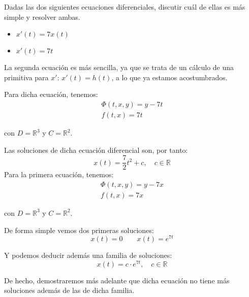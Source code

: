 \begin{ejemplo}
    Dadas las dos siguientes ecuaciones diferenciales, discutir cuál de ellas es más simple y resolver ambas.
    \begin{itemize}
        \item $x'(t) = 7x(t)$
        \item $x'(t) = 7t$
    \end{itemize}
    La segunda ecuación es más sencilla, ya que se trata de un cálculo de una primitiva para $x'$: $x'(t) = h(t)$, a lo que ya estamos acostumbrados.

    Para dicha ecuación, tenemos:
    \begin{gather*}
        \Phi(t,x,y) = y-7t \\
        f(t,x) = 7t
    \end{gather*}

    con $D=\mathbb{R}^3$ y $C=\mathbb{R}^2$.

    Las soluciones de dicha ecuación diferencial son, por tanto:
    \begin{equation*}
        x(t) = \frac{7}{2} t^2 + c, \quad c\in \mathbb{R}
    \end{equation*}
    Para la primera ecuación, tenemos:
    \begin{gather*}
        \Phi(t,x,y) = y-7x \\
        f(t,x) = 7x
    \end{gather*}

    con $D=\mathbb{R}^3$ y $C=\mathbb{R}^2$.

    De forma simple vemos dos primeras soluciones:
    \begin{equation*}
        x(t) = 0 \qquad  x(t) = e^{7t}
    \end{equation*}

    Y podemos deducir además una familia de soluciones:
    \begin{equation*}
        x(t) = c \cdot e^{7t}, \quad c\in \mathbb{R}
    \end{equation*}

    De hecho, demostraremos más adelante que dicha ecuación no tiene más soluciones además de las de dicha familia.

\end{ejemplo}
   
